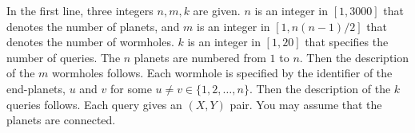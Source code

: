 In the first line, three integers $n, m, k$ are given. $n$ is an integer in $[1, 3000]$ that denotes the number of planets, and $m$ is an integer in $[1, n(n-1)/2]$ that denotes the number of wormholes. $k$ is an integer in $[1, 20]$ that specifies the number of queries. The $n$ planets are numbered from $1$ to $n$. Then the description of the $m$ wormholes follows. Each wormhole is specified by the identifier of the end-planets, $u$ and $v$ for some $u \ne v \in \{1, 2, \ldots, n\}$. Then the description of the $k$ queries follows. Each query gives an $(X, Y)$ pair. You may assume that the planets are connected.
